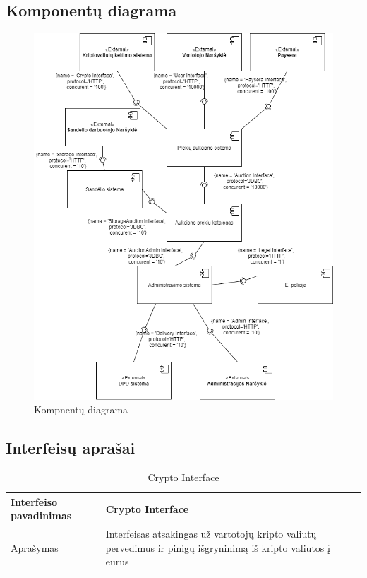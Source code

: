 \documentclass{VUMIFPSmagistrinis}
\begin{document}
			\subsection{Komponentų diagrama}
				\begin{figure}[H]
				\centering
				\includegraphics[scale=0.7]{img/function}
				\caption{Kompnentų diagrama} %
				\label{img:text}
				\end{figure}
			\subsection{Interfeisų aprašai}

				\begin{table}[H]
				\centering
				\begin{tabular}{|L|p{9cm}|}\hline
			 		Interfeiso pavadinimas& Crypto Interface\\ \hline
			 		Aprašymas& Interfeisas atsakingas už vartotojų kripto valiutų pervedimus ir pinigų išgryninimą iš kripto valiutos į eurus \\ \hline
				\end{tabular}
				\caption{Crypto Interface}
				\end{table}
\end{document}
